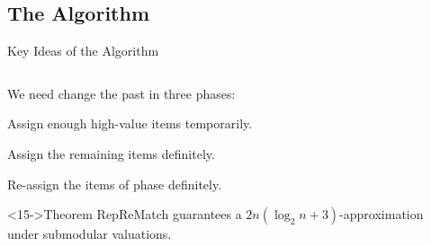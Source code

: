 




\subsection{The Algorithm}
\begin{frame}{Key Ideas of the Algorithm}
	\begin{columns}[t, onlytextwidth]
		\begin{column}{0.6\textwidth}
			We need change the past in three phases:
			\begin{description}
				\item<2->[Phase \phasei]
				Assign enough high-value items \alert<2>{temporarily}.

				\item<7->[Phase \phaseii]
				Assign the remaining items \alert<7>{definitely}.

				\item<12->[Phase \phaseiii]
				Re-assign the items of phase \phasei{} \alert<12>{definitely}.
			\end{description}

			\smallskip

			\begin{exampleblock}<15->{Theorem}
				RepReMatch guarantees a \(2n(\log_2 n + 3)\)-approximation \\
				under submodular valuations.
			\end{exampleblock}
		\end{column}
		\begin{column}{0.4\textwidth}
			\vphantom{a}\vspace{-1\baselineskip}\par
			\centering
\end{column}
\end{columns}
\end{frame}
